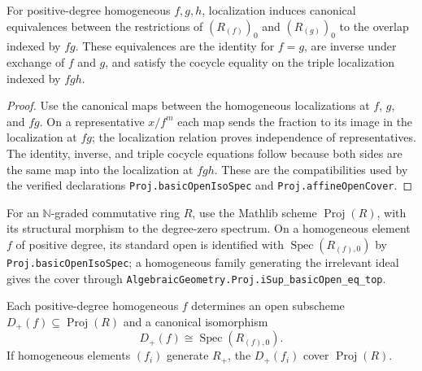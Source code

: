 \begin{lemma}
  \label{lemma:nagata-proj-chart-ring-cocycle}

  For positive-degree homogeneous $f,g,h$, localization induces canonical
  equivalences between the restrictions of $(R_{(f)})_0$ and
  $(R_{(g)})_0$ to the overlap indexed by $fg$.  These equivalences are the
  identity for $f=g$, are inverse under exchange of $f$ and $g$, and satisfy
  the cocycle equality on the triple localization indexed by $fgh$.
\end{lemma}

\begin{proof}
  Use the canonical maps between the homogeneous localizations at $f$, $g$,
  and $fg$.  On a representative $x/f^m$ each map sends the fraction to its
  image in the localization at $fg$; the localization relation proves
  independence of representatives.  The identity, inverse, and triple
  cocycle equations follow because both sides are the same map into the
  localization at $fgh$.  These are the compatibilities used by the verified
  declarations \texttt{Proj.basicOpenIsoSpec} and
  \texttt{Proj.affineOpenCover}.
\end{proof}

\begin{definition}
  \label{def:nagata-affine-proj}

  For an $\mathbb N$-graded commutative ring $R$, use the Mathlib scheme
  $\operatorname{Proj}(R)$, with its structural morphism to the degree-zero
  spectrum.  On a homogeneous element $f$ of positive degree, its standard
  open is identified with $\operatorname{Spec}(R_{(f),0})$ by
  \texttt{Proj.basicOpenIsoSpec}; a homogeneous family generating the
  irrelevant ideal gives the cover through
  \texttt{AlgebraicGeometry.Proj.iSup\_basicOpen\_eq\_top}.
\end{definition}

\begin{proposition}
  \label{prop:nagata-proj-standard-open}

  Each positive-degree homogeneous $f$ determines an open subscheme
  $D_+(f)\subseteq\operatorname{Proj}(R)$ and a canonical isomorphism
  \[
    D_+(f)\cong\operatorname{Spec}(R_{(f),0}).
  \]
  If homogeneous elements $(f_i)$ generate $R_+$, the $D_+(f_i)$ cover
  $\operatorname{Proj}(R)$.
\end{proposition}


